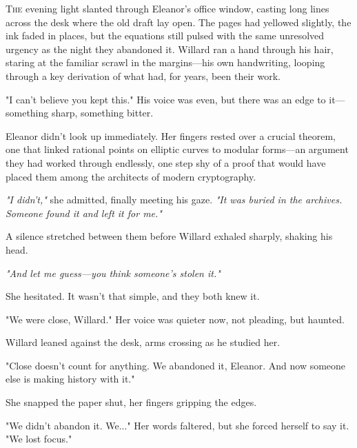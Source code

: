 \lettrine{T}{he} evening light slanted through Eleanor’s office window, casting long lines across the desk where the old draft lay open. The pages had yellowed slightly, the ink faded in places, but the equations still pulsed with the same unresolved urgency as the night they abandoned it. Willard ran a hand through his hair, staring at the familiar scrawl in the margins—his own handwriting, looping through a key derivation of what had, for years, been their work.

\smallskip

"I can’t believe you kept this." His voice was even, but there was an edge to it—something sharp, something bitter.

\smallskip

Eleanor didn’t look up immediately. Her fingers rested over a crucial theorem, one that linked rational points on elliptic curves to modular forms—an argument they had worked through endlessly, one step shy of a proof that would have placed them among the architects of modern cryptography.

\smallskip

\textit{"I didn’t,"} she admitted, finally meeting his gaze. \textit{"It was buried in the archives. Someone found it and left it for me."}

\smallskip

A silence stretched between them before Willard exhaled sharply, shaking his head.

\smallskip

\textit{"And let me guess—you think someone’s stolen it."}

\smallskip

She hesitated. It wasn’t that simple, and they both knew it.

\smallskip

"We were close, Willard." Her voice was quieter now, not pleading, but haunted.

\smallskip

Willard leaned against the desk, arms crossing as he studied her.

\smallskip

"Close doesn’t count for anything. We abandoned it, Eleanor. And now someone else is making history with it."

\smallskip

She snapped the paper shut, her fingers gripping the edges.

\smallskip

"We didn’t abandon it. We..." Her words faltered, but she forced herself to say it. "We lost focus."

